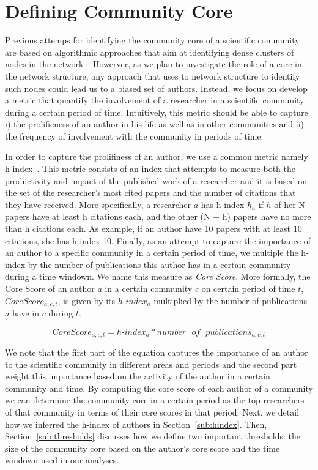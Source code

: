 \section{Defining Community Core}

Previous attemps for identifying the community core of a scientific community are based on algorithmic approaches that aim at identifying dense clusters of nodes in the
network~\cite{Seifi:2012:CCE:2187980.2188258}.  Howerver, as we plan to investigate the role of a core in the network structure, any approach that uses to network structure to
identify such nodes could lead us to a biased set of authors. Instead, we focus on develop a metric that quantify the involvement of a researcher in a scientific community during a
certain period of time.  Intuitively, this metric should be able to capture i) the prolificness of an author in his life as well as in other communities and ii) the frequency of
involvement with the community in periods of time. 

In order to capture the prolifiness of an author, we use a common metric namely h-index~\cite{Hirsch:2005}. This metric consists of 
an index that attempts to measure both the productivity and impact of the published work of a researcher and it is based on the set of the researcher's 
most cited papers and the number of citations that they have received. More specifically, a researcher $a$ has h-index $h_a$ if $h$ of her N papers have at least h citations each, and the
other (N − h) papers have no more than h citations each. As example, if an author have 10 papers with at least 10 citations, she has h-index 10. 
Finally, as an attempt to capture the importance of an author to a specific community in a certain period of time, we multiple the h-index by the number of publications this author has in a certain
community during a time windown. We name this measure as \textit{Core Score}. More formally, the Core Score of an author $a$ in a certain community $c$ on certain period of time
$t$, $Core{ }Score_{a,c,t}$, is given by its $h\textrm{-}index_a$ multiplied by the number of publications $a$ have in $c$ during $t$.  

\begin{equation} 
  \label{eq:core_score}
  Core{ }Score_{a,c,t} = h\textrm{-}index_a * number\textrm{ }of\textrm{ }publications_{a,c,t}
\end{equation}

We note that the first part of the equation captures the importance of an author to the scientific community in different areas and periods and the second part weight this
importance based on the activity of the author in a certain community and time.  By computing the core score of each author of a community we can determine the community core in a
certain period as the top researchers of that community in terms of their core scores in that period. Next, we detail how we inferred the h-index of authors in
Section~\ref{sub:hindex}.  Then, Section~\ref{sub:thresholds} discusses how we define two important thresholds: the size of the community core based on the author's core score and
the time windown used in our analyses.


